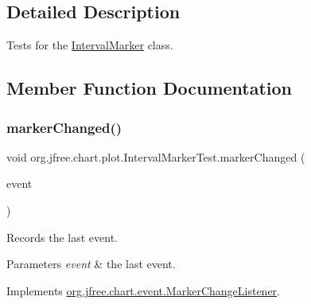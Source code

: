 \subsection{Detailed Description}
Tests for the \mbox{\hyperlink{classorg_1_1jfree_1_1chart_1_1plot_1_1_interval_marker}{Interval\+Marker}} class. 

\subsection{Member Function Documentation}
\mbox{\label{classorg_1_1jfree_1_1chart_1_1plot_1_1_interval_marker_test_a04176f0b63a0fc39aa5dfcbccaed2a9b}} 
\subsubsection{\texorpdfstring{marker\+Changed()}{markerChanged()}}
{\footnotesize\ttfamily void org.\+jfree.\+chart.\+plot.\+Interval\+Marker\+Test.\+marker\+Changed (\begin{DoxyParamCaption}\item[{\mbox{\hyperlink{classorg_1_1jfree_1_1chart_1_1event_1_1_marker_change_event}{Marker\+Change\+Event}}}]{event }\end{DoxyParamCaption})}

Records the last event.


\begin{DoxyParams}{Parameters}
{\em event} & the last event. \\
\hline
\end{DoxyParams}


Implements \mbox{\hyperlink{interfaceorg_1_1jfree_1_1chart_1_1event_1_1_marker_change_listener_a0797552ac12ca77a9ddd96cfe5abb60e}{org.\+jfree.\+chart.\+event.\+Marker\+Change\+Listener}}.

\mbox{\label{classorg_1_1jfree_1_1chart_1_1plot_1_1_interval_marker_test_a94b2bc87c632a51d1e534039cc6b4a26}} 
